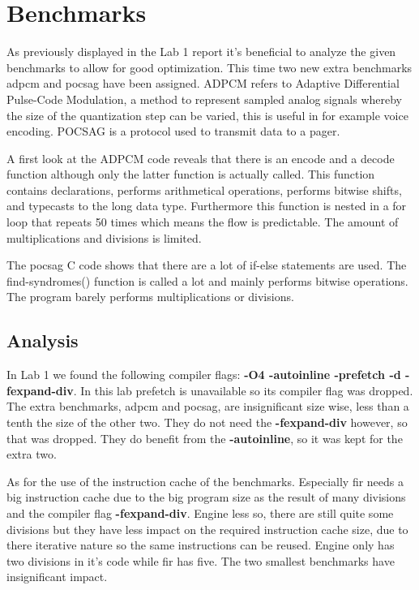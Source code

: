 \section{Benchmarks}
\label{sec:benchmarks}
As previously displayed in the Lab 1 report it's beneficial to analyze the given benchmarks to allow for good optimization.
This time two new extra benchmarks adpcm and pocsag have been assigned.
ADPCM refers to Adaptive Differential Pulse-Code Modulation, a method to represent sampled analog signals whereby the size of the quantization step can be varied, this is useful in for example voice encoding.
POCSAG is a protocol used to transmit data to a pager.


A first look at the ADPCM code reveals that there is an encode and a decode function although only the latter function is actually called.
This function contains declarations, performs arithmetical operations, performs bitwise shifts, and typecasts to the long data type.
Furthermore this function is nested in a for loop that repeats 50 times which means the flow is predictable.
The amount of multiplications and divisions is limited.


The pocsag C code shows that there are a lot of if-else statements are used.
The find-syndromes() function is called a lot and mainly performs bitwise operations.
The program barely performs multiplications or divisions.

\subsection{Analysis}
\label{ssec:benchmarks-analysis}
In Lab 1 we found the following compiler flags: \textbf{-O4 -autoinline -prefetch -d -fexpand-div}.
In this lab prefetch is unavailable so its compiler flag was dropped.
The extra benchmarks, adpcm and pocsag, are insignificant size wise, less than a tenth the size of the other two.
They do not need the \textbf{-fexpand-div} however, so that was dropped.
They do benefit from the \textbf{-autoinline}, so it was kept for the extra two.

As for the use of the instruction cache of the benchmarks.
Especially fir needs a big instruction cache due to the big program size as the result of many divisions and the compiler flag \textbf{-fexpand-div}.
Engine less so, there are still quite some divisions but they have less impact on the required instruction cache size, due to there iterative nature so the same instructions can be reused.
Engine only has two divisions in it's code while fir has five.
The two smallest benchmarks have insignificant impact.
